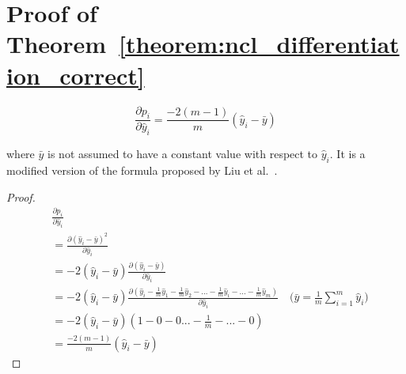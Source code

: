 \documentclass{article}
\begin{document}
\section{Proof of Theorem~\ref{theorem:ncl_differentiation_correct}}
\label{appendix:ncl_differentiation_correct}
\[
\frac{\partial{p_i}}{\partial{\hat{y}_i}} = \frac{-2 (m - 1)}{m} (\hat{y}_i - \bar{y})
\]
\begin{center}
    \begin{minipage}{0.8\linewidth}
        \small
        where $\bar{y}$ is not assumed to have a constant value with respect to $\hat{y}_i$. It is a modified version of the formula proposed by Liu et al.\ \cite{liu1999negative}. 
    \end{minipage}
    \begin{proof}
        \begin{align*}
            &\frac{\partial{p_i}}{\partial{\hat{y}_i}}
            \\
            &= \frac{\partial{(\hat{y}_i - \bar{y})^2}}{\partial{\hat{y}_i}}
            \\
            &= -2 (\hat{y}_i - \bar{y}) \frac{\partial{(\hat{y}_i - \bar{y})}}{\partial{\hat{y}_i}}
            \\
            &= -2 (\hat{y}_i - \bar{y}) \frac{\partial{(\hat{y}_i - \frac{1}{m} \hat{y}_1 - \frac{1}{m} \hat{y}_2 - ... - \frac{1}{m} \hat{y}_i - ... - \frac{1}{m} \hat{y}_m)}}{\partial{\hat{y}_i}} \quad \text{(}\bar{y} = \frac{1}{m} \sum_{i = 1}^m \hat{y}_i\text{)}
            \\
            &= -2 (\hat{y}_i - \bar{y}) (1 - 0 - 0 ... - \frac{1}{m} - ... - 0)
            \\
            &= \frac{-2 (m - 1)}{m} (\hat{y}_i - \bar{y})
        \end{align*}
    \end{proof}
\end{center}
\end{document}
